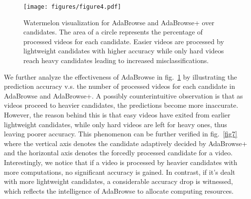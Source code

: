 \documentclass[sigconf]{acmart}
\begin{document}
  \begin{figure}[t]
    \centering
    \texttt{[image: figures/figure4.pdf]} 
    \caption{Watermelon visualization for AdaBrowse and AdaBrowse+ over candidates. The area of a circle represents the percentage of processed videos for each candidate. Easier videos are processed by lightweight candidates with higher accuracy while only hard videos reach heavy candidates leading to increased misclassifications.}
    \label{fig8}
  \end{figure}
  
We further analyze the effectiveness of AdaBrowse in fig.~\ref{fig8} by illustrating the prediction accuracy v.s. the number of processed videos for each candidate in AdaBrowse and AdaBrowse+. A possibly counterintuitive observation is that as videos proceed to heavier candidates, the predictions become more inaccurate. However, the reason behind this is that easy videos have exited from earlier lightweight candidates, while only hard videos are left for heavy ones, thus leaving poorer accuracy. This phenomenon can be further verified in fig.~\ref{fig7} where the vertical axis denotes the candidate adaptively decided by AdaBrowse+ and the horizontal axis denotes the forcedly processed candidate for a video. Interestingly, we notice that if a video is processed by heavier candidates with more computations, no significant accuracy is gained. In contrast, if it's dealt with more lightweight candidates, a considerable accuracy drop is witnessed, which reflects the intelligence of AdaBrowse to allocate computing resources.
  
\end{document}
